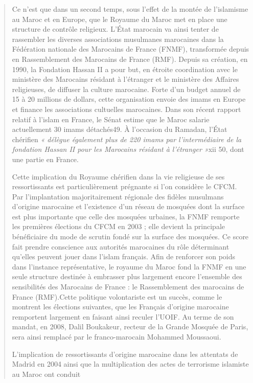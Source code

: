 \begin{quote}
Ce n'est que dans un second temps, sous l'effet de la montée de
l'islamisme au Maroc et en Europe, que le Royaume du Maroc met en place
une structure de contrôle religieux. L'État marocain va ainsi tenter de
rassembler les diverses associations musulmanes marocaines dans la
Fédération nationale des Marocains de France (FNMF), transformée depuis
en Rassemblement des Marocains de France (RMF). Depuis sa création, en
1990, la Fondation Hassan II a pour but, en étroite coordination avec le
ministère des Marocains résidant à l'étranger et le ministère des
Affaires religieuses, de diffuser la culture marocaine. Forte d'un
budget annuel de 15 à 20 millions de dollars, cette organisation envoie
des imams en Europe et finance les associations cultuelles marocaines.
Dans son récent rapport relatif à l'islam en France, le Sénat estime que
le Maroc salarie actuellement 30 imams détachés49. À l'occasion du
Ramadan, l'État chérifien \emph{« délègue également plus de 220 imams
par l'intermédiaire de la fondation Hassan II pour les Marocains
résidant à l'étranger »}xii 50, dont une partie en France.

Cette implication du Royaume chérifien dans la vie religieuse de ses
ressortissants est particulièrement prégnante si l'on considère le CFCM.
Par l'implantation majoritairement régionale des fidèles musulmans
d'origine marocaine et l'existence d'un réseau de mosquées dont la
surface est plus importante que celle des mosquées urbaines, la FNMF
remporte les premières élections du CFCM en 2003 ; elle devient la
principale bénéficiaire du mode de scrutin fondé sur la surface des
mosquées. Ce score fait prendre conscience aux autorités marocaines du
rôle déterminant qu'elles peuvent jouer dans l'islam français. Afin de
renforcer son poids dans l'instance représentative, le royaume du Maroc
fond la FNMF en une seule structure destinée à embrasser plus largement
encore l'ensemble des sensibilités des Marocains de France : le
Rassemblement des marocains de France (RMF).Cette politique volontariste
est un succès, comme le montrent les élections suivantes, que les
Français d'origine marocaine remportent largement en faisant ainsi
reculer l'UOIF. Au terme de son mandat, en 2008, Dalil Boukakeur,
recteur de la Grande Mosquée de Paris, sera ainsi remplacé par le
franco-marocain Mohammed Moussaoui.

L'implication de ressortissants d'origine marocaine dans les attentats
de Madrid en 2004 ainsi que la multiplication des actes de terrorisme
islamiste au Maroc ont conduit


\end{quote}
